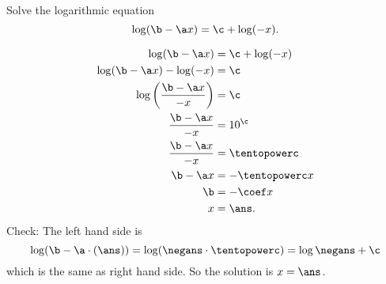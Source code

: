 






\pgfmathtruncatemacro{\a}{\tentopowerc-\coef}
\pgfmathtruncatemacro{\negans}{-\ans}
\pgfmathtruncatemacro{\b}{-\coef*\ans}

Solve the logarithmic equation 
\[\log(\b-\a x)=\c+\log(-x).\]


\begin{solution}
		\[\begin{split}
		\log(\b-\a x)&=\c+\log(-x)\\
		\log(\b-\a x)-\log(-x)&=\c\\
		\log\left(\frac{\b-\a x}{-x}\right)&=\c\\
		 \frac{\b-\a x}{-x} &=10^\c\\
		  \frac{\b-\a x}{-x} &=\tentopowerc\\
		  \b-\a x&=-\tentopowerc x\\
		  \b&=-\coef x\\
		  x&=\ans.
		\end{split}
		\]
Check: The left hand side is 
\[\log(\b-\a\cdot (\ans))=\log(\negans\cdot\tentopowerc)=\log\negans+\c\]
which is the same as right hand side.
So the solution is $x=\ans$.
\end{solution}
